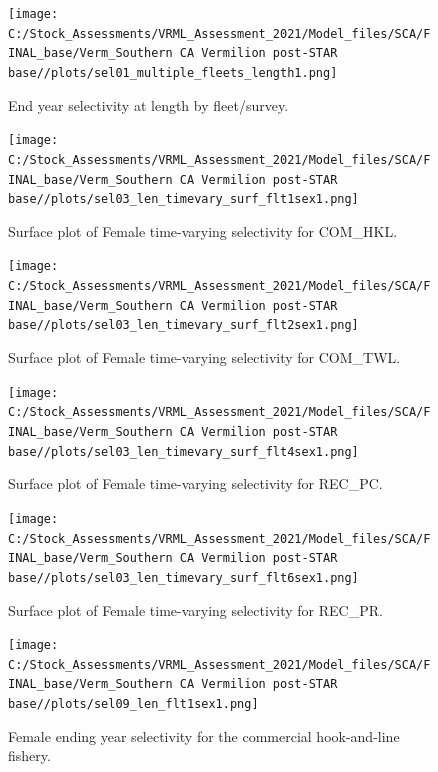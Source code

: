 \documentclass[
  english,
  a4paper,
]{article}
\begin{document}
\FloatBarrier

\begin{figure}
\centering
\texttt{[image: C:/Stock\_Assessments/VRML\_Assessment\_2021/Model\_files/SCA/FINAL\_base/Verm\_Southern CA Vermilion post-STAR base//plots/sel01\_multiple\_fleets\_length1.png]}
\caption{End year selectivity at length by fleet/survey.\label{fig:selex-length-all}}
\end{figure}

\FloatBarrier

\begin{figure}
\centering
\texttt{[image: C:/Stock\_Assessments/VRML\_Assessment\_2021/Model\_files/SCA/FINAL\_base/Verm\_Southern CA Vermilion post-STAR base//plots/sel03\_len\_timevary\_surf\_flt1sex1.png]}
\caption{Surface plot of Female time-varying selectivity for COM\_HKL.\label{fig:sel03_len_timevary_surf_flt1sex1}}
\end{figure}

\begin{figure}
\centering
\texttt{[image: C:/Stock\_Assessments/VRML\_Assessment\_2021/Model\_files/SCA/FINAL\_base/Verm\_Southern CA Vermilion post-STAR base//plots/sel03\_len\_timevary\_surf\_flt2sex1.png]}
\caption{Surface plot of Female time-varying selectivity for COM\_TWL.\label{fig:sel03_len_timevary_surf_flt2sex1}}
\end{figure}

\begin{figure}
\centering
\texttt{[image: C:/Stock\_Assessments/VRML\_Assessment\_2021/Model\_files/SCA/FINAL\_base/Verm\_Southern CA Vermilion post-STAR base//plots/sel03\_len\_timevary\_surf\_flt4sex1.png]}
\caption{Surface plot of Female time-varying selectivity for REC\_PC.\label{fig:sel03_len_timevary_surf_flt4sex1}}
\end{figure}

\begin{figure}
\centering
\texttt{[image: C:/Stock\_Assessments/VRML\_Assessment\_2021/Model\_files/SCA/FINAL\_base/Verm\_Southern CA Vermilion post-STAR base//plots/sel03\_len\_timevary\_surf\_flt6sex1.png]}
\caption{Surface plot of Female time-varying selectivity for REC\_PR.\label{fig:sel03_len_timevary_surf_flt6sex1}}
\end{figure}

\FloatBarrier

\FloatBarrier

\begin{figure}
\centering
\texttt{[image: C:/Stock\_Assessments/VRML\_Assessment\_2021/Model\_files/SCA/FINAL\_base/Verm\_Southern CA Vermilion post-STAR base//plots/sel09\_len\_flt1sex1.png]}
\caption{Female ending year selectivity for the commercial hook-and-line fishery.\label{fig:endyr-selex-COM-HKL}}
\end{figure}
\end{document}
